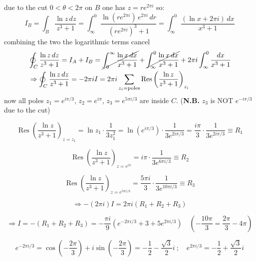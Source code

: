 \documentclass{article}
\begin{document}
\noindent
due to the cut $0<\theta<2\pi$ on $B$ one has $z = re^{2\pi i }$ so:
\begin{equation}
    I_B = \int_{B} \frac{\ln z \, dz}{z^3 + 1}
= \int_{\infty}^{0} \frac{\ln(re^{2\pi i}) \, e^{2\pi i} \, dr}{(re^{2\pi i})^3 + 1}
= \int_{\infty}^{0} \frac{(\ln x + 2\pi i) \, dx}{x^3 + 1}
\end{equation}
combining the two the logarithmic terms cancel
\begin{align*}
    &\oint_C \frac{\ln z \, dz}{z^3 + 1}
= I_A + I_B
= \cancel{\int_0^\infty \frac{\ln x \, dx}{x^3 + 1}}
+ \cancel{\int_\infty^0 \frac{\ln x \, dx}{x^3 + 1}}
+ 2\pi i \int_\infty^0 \frac{dx}{x^3 + 1}\\
&\Rightarrow \oint_C \frac{\ln z \, dz}{z^3 + 1}
= -2\pi i I
= 2\pi i \sum_{z_i = \text{poles}} \operatorname{Res} \left( \frac{\ln z}{z^3 + 1} \right)_{z_i}
\end{align*}
now all poles $z_1 = e^{i\pi/3}$, $z_2 = e^{i\pi}$, $z_3 = e^{5\pi i/3}$ are inside $C$. (\textbf{N.B.} $z_3$ is NOT $e^{-i\pi/3}$ due to the cut)

\newpage

\[
\operatorname{Res} \left( \frac{\ln z}{z^3 + 1}  \right)_{z = z_1}
= \ln z_1 \cdot \frac{1}{3 z_1^2}
= \ln \left( e^{i\pi/3} \right) \cdot \frac{1}{3 e^{2i\pi/3}}
= \frac{i\pi}{3} \cdot \frac{1}{3 e^{2i\pi/3}} \equiv R_1
\]

\[
\operatorname{Res} \left( \frac{\ln z}{z^3 + 1}  \right)_{z = e^{i\pi}}
= i\pi \cdot \frac{1}{3 e^{6\pi i / 3}} \equiv R_2
\]

\[
\operatorname{Res} \left( \frac{\ln z}{z^3 + 1}  \right)_{z = e^{5\pi i / 3}}
= \frac{5\pi i}{3} \cdot \frac{1}{3 e^{10\pi i / 3}} \equiv R_3
\]

\begin{equation}
    \Rightarrow -(2\pi i) I = 2\pi i \left( R_1 + R_2 + R_3 \right)
\end{equation}

\begin{equation}
    \Rightarrow I = -\left( R_1 + R_2 + R_3 \right)
= -\frac{\pi i}{9} \left( e^{-2\pi i / 3} + 3 + 5e^{2\pi i / 3} \right) 
\quad \left( -\frac{10\pi}{3} = \frac{2\pi}{3} - 4\pi \right)
\end{equation}

\begin{equation}
    e^{-2\pi i / 3} = \cos\left(- \frac{2\pi}{3} \right) + i \sin\left(- \frac{2\pi}{3} \right)
= -\frac{1}{2} - \frac{\sqrt{3}}{2} i \ ; \quad e^{2\pi i / 3} = -\frac{1}{2} + \frac{\sqrt{3}}{2} i
\end{equation}
\end{document}
